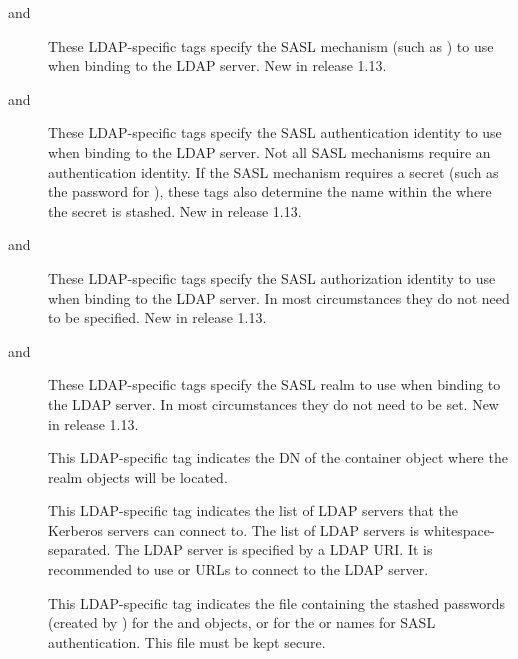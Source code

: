 \documentclass[letterpaper,10pt,english]{sphinxmanual}
\begin{document}
\begin{description}
\item[{ and }] \leavevmode
These LDAP-specific tags specify the SASL mechanism (such as
) to use when binding to the LDAP server.  New in
release 1.13.

\item[{ and }] \leavevmode
These LDAP-specific tags specify the SASL authentication identity
to use when binding to the LDAP server.  Not all SASL mechanisms
require an authentication identity.  If the SASL mechanism
requires a secret (such as the password for ), these
tags also determine the name within the
 where the secret is stashed.  New
in release 1.13.

\item[{ and }] \leavevmode
These LDAP-specific tags specify the SASL authorization identity
to use when binding to the LDAP server.  In most circumstances
they do not need to be specified.  New in release 1.13.

\item[{ and }] \leavevmode
These LDAP-specific tags specify the SASL realm to use when
binding to the LDAP server.  In most circumstances they do not
need to be set.  New in release 1.13.

\item[{}] \leavevmode
This LDAP-specific tag indicates the DN of the container object
where the realm objects will be located.

\item[{}] \leavevmode
This LDAP-specific tag indicates the list of LDAP servers that the
Kerberos servers can connect to.  The list of LDAP servers is
whitespace-separated.  The LDAP server is specified by a LDAP URI.
It is recommended to use  or  URLs to connect
to the LDAP server.

\item[{}] \leavevmode
This LDAP-specific tag indicates the file containing the stashed
passwords (created by ) for the
 and  objects, or for the
 or  names
for SASL authentication.  This file must be kept secure.


\end{description}
\end{document}
